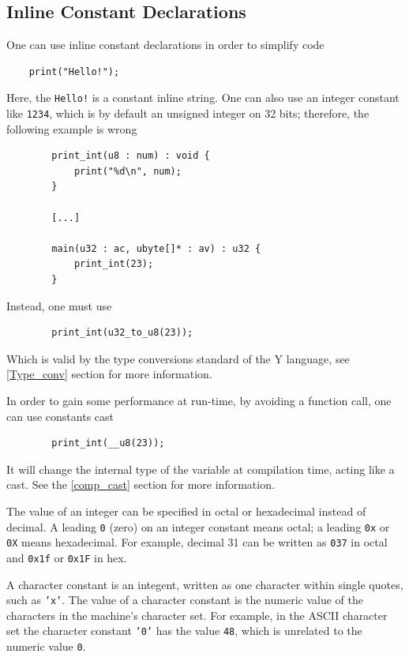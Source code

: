 \documentclass{scrartcl}
\begin{document}
        \subsection{Inline Constant Declarations}
            One can use inline constant declarations in order to simplify code
            \begin{lstlisting}
    print("Hello!");
            \end{lstlisting}
            Here, the \texttt{Hello!} is a constant inline string. One can also
            use an integer constant like \texttt{1234}, which is by default an
            unsigned integer on 32 bits; therefore, the following example is wrong
            \begin{lstlisting}
        print_int(u8 : num) : void {
            print("%d\n", num);
        }

        [...]

        main(u32 : ac, ubyte[]* : av) : u32 {
            print_int(23);
        }
            \end{lstlisting}
            Instead, one must use
            \begin{lstlisting}
        print_int(u32_to_u8(23));
            \end{lstlisting}
            Which is valid by the type conversions standard of the Y language, see
            \ref{Type_conv} section for more information.

            In order to gain some performance at run-time, by avoiding a function call,
            one can use constants cast
            \begin{lstlisting}
        print_int(__u8(23));
            \end{lstlisting}
            It will change the internal type of the variable at compilation time,
            acting like a cast. See the \ref{comp_cast} section for more information.

            The value of an integer can be specified in octal or hexadecimal
            instead of decimal. A leading \texttt{0} (zero) on an integer
            constant means octal; a leading \texttt{0x} or \texttt{0X} means
            hexadecimal.  For example, decimal 31 can be written as
            \texttt{037} in octal and \texttt{0x1f} or \texttt{0x1F} in hex.

            A character constant is an integent, written as one character within
            single quotes, such as \texttt{'x'}. The value of a character constant
            is the numeric value of the characters in the machine's character set.
            For example, in the ASCII character set the character constant \texttt{'0'}
            has the value \texttt{48}, which is unrelated to the numeric value \texttt{0}.
\end{document}
